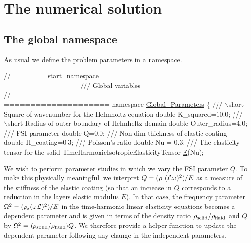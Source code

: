 \hypertarget{index_num_soln}{}\section{The numerical solution}\label{index_num_soln}
\hypertarget{index_namespace}{}\subsection{The global namespace}\label{index_namespace}
As usual we define the problem parameters in a namespace.  
\begin{DoxyCodeInclude}
\textcolor{comment}{//=======start\_namespace==========================================}
\textcolor{comment}{/// Global variables}
\textcolor{comment}{}\textcolor{comment}{//================================================================}
\textcolor{keyword}{namespace }\hyperlink{namespaceGlobal__Parameters}{Global\_Parameters}
\{
\textcolor{comment}{}
\textcolor{comment}{ /// \(\backslash\)short Square of wavenumber for the Helmholtz equation}
\textcolor{comment}{} \textcolor{keywordtype}{double} K\_squared=10.0;
 \textcolor{comment}{}
\textcolor{comment}{ /// \(\backslash\)short Radius of outer boundary of Helmholtz domain}
\textcolor{comment}{} \textcolor{keywordtype}{double} Outer\_radius=4.0; 
\textcolor{comment}{}
\textcolor{comment}{ /// FSI parameter}
\textcolor{comment}{} \textcolor{keywordtype}{double} Q=0.0;
\textcolor{comment}{}
\textcolor{comment}{ /// Non-dim thickness of elastic coating}
\textcolor{comment}{} \textcolor{keywordtype}{double} H\_coating=0.3; 
 \textcolor{comment}{}
\textcolor{comment}{ /// Poisson's ratio}
\textcolor{comment}{} \textcolor{keywordtype}{double} Nu = 0.3;
\textcolor{comment}{}
\textcolor{comment}{ /// The elasticity tensor for the solid}
\textcolor{comment}{} TimeHarmonicIsotropicElasticityTensor \hyperlink{namespaceGlobal__Parameters_aeeb26e11ef275bdfce14710e00290bb6}{E}(Nu);

\end{DoxyCodeInclude}


We wish to perform parameter studies in which we vary the F\+SI parameter $ Q $. To make this physically meaningful, we interpret $ Q =(\rho_{\rm f}({\cal L}\omega)^2)/E $ as a measure of the stiffness of the elastic coating (so that an increase in $ Q $ corresponds to a reduction in the layer\textquotesingle{}s elastic modulus $ E $). In that case, the frequency parameter $ \Omega^2 = (\rho_{\rm s} (\omega {\cal L})^2)/E $ in the time-\/harmonic linear elasticity equations becomes a dependent parameter and is given in terms of the density ratio $ \rho_{\rm solid}/\rho_{\rm fluid} $ and $ Q $ by $ \Omega^2 = (\rho_{\rm solid}/\rho_{\rm fluid}) Q$. We therefore provide a helper function to update the dependent parameter following any change in the independent parameters.


